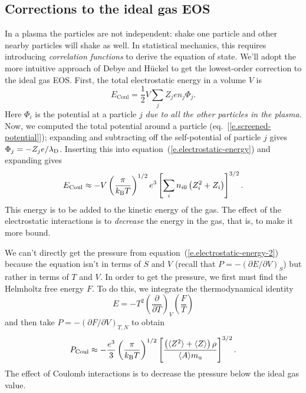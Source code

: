 \subsection{Corrections to the ideal gas EOS}\label{s.plasma-corrections}

In a plasma the particles are not independent: shake one particle and other nearby particles will shake as well. In statistical mechanics, this requires introducing \emph{correlation functions} to derive the equation of state.  We'll adopt the more intuitive approach of Debye and H\"uckel to get the lowest-order correction to the ideal gas EOS.  First, the total electrostatic energy in a volume $V$ is
\begin{equation}\label{e.electrostatic-energy}
E_{\mathrm{Coul}} = \frac{1}{2}V\sum_{j}Z_{j}e n_{j}\Phi_{j}.
\end{equation}
Here $\Phi_{i}$ is the potential at a particle $j$ \emph{due to all the other particles in the plasma.}  Now, we computed the total potential around a particle (eq.~[\ref{e.screened-potential}]); expanding and subtracting off the self-potential of particle $j$ gives $\Phi_{j} = -Z_{j}e/\lambda_{\mathrm{D}}$.  Inserting this into equation~(\ref{e.electrostatic-energy}) and expanding gives
\begin{equation}\label{e.electrostatic-energy-2}
E_{\mathrm{Coul}} \approx - V\left(\frac{\pi}{k_\mathrm{B} T}\right)^{1/2} e^{3} \left[\sum_{i}n_{i0} \left(Z_{i}^{2} + Z_{i}\right)\right]^{3/2}.
\end{equation}
This energy is to be added to the kinetic energy of the gas.  The effect of the electrostatic interactions is to \emph{decrease} the energy in the gas, that is, to make it more bound.

We can't directly get the pressure from equation~(\ref{e.electrostatic-energy-2}) because the equation isn't in terms of $S$ and $V$ (recall that $P = -(\partial E/\partial V)_{S}$) but rather in terms of $T$ and $V$.
In order to get the pressure, we first must find the Helmholtz free energy $F$. To do this, we integrate the thermodynamical identity
\[ E = -T^{2}\left(\frac{\partial}{\partial T}\right)_{V}\left(\frac{F}{T}\right)
\] 
and then take $P = -(\partial F/\partial V)_{T,N}$ to obtain
\begin{equation}\label{e.pressure-correction}
 P_{\mathrm{Coul}} \approx -\frac{e^{3}}{3}\left(\frac{\pi}{k_\mathrm{B} T}\right)^{1/2}\left[\frac{\left(\langle Z^{2}\rangle+\langle Z\rangle \right)\rho}{\langle A\rangle m_\mathrm{u}}\right]^{3/2}.
\end{equation}
The effect of Coulomb interactions is to decrease the pressure below the ideal gas value.

